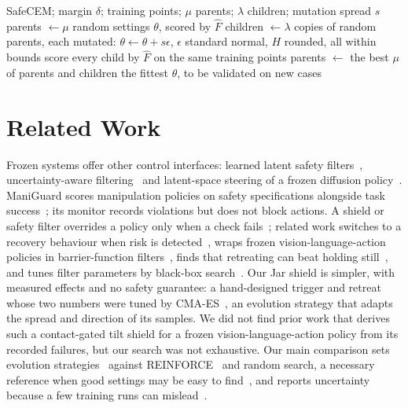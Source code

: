 \documentclass[sigconf,nonacm]{acmart}
\begin{document}
\begin{algorithm}[t]
\caption{Planned evolution search over a fixed adapter (not yet run)}
\label{alg:evo}
\small
\begin{algorithmic}[1]
\Require SafeCEM; margin $\delta$; training points; $\mu$ parents;
$\lambda$ children; mutation spread $s$
\State parents $\gets\mu$ random settings $\theta$, scored by $\hat F$
  \State children $\gets\lambda$ copies of random parents, each mutated:
  $\theta\gets\theta+s\epsilon$, $\epsilon$ standard normal, $H$ rounded,
  all within bounds
  \State score every child by $\hat F$ on the same training points
  \State parents $\gets$ the best $\mu$ of parents and children
\EndFor
\State \Return the fittest $\theta$, to be validated on new cases
\end{algorithmic}
\end{algorithm}

\section{Related Work}
Frozen systems offer other control interfaces: learned latent safety
filters~\cite{nakamura2025latent}, uncertainty-aware
filtering~\cite{seo2025unisafe} and latent-space steering of a frozen
diffusion policy~\cite{wagenmaker2025dsrl}. ManiGuard scores manipulation
policies on safety specifications alongside task
success~\cite{peng2026maniguard}; its monitor records violations but does
not block actions. A shield or safety filter overrides a policy only when a
check fails~\cite{alshiekh2018shielding,hsu2024safetyfilter}; related work
switches to a recovery behaviour when risk is
detected~\cite{thananjeyan2021recovery}, wraps frozen vision-language-action
policies in barrier-function filters~\cite{hu2025vlsa}, finds that
retreating can beat holding still~\cite{cao2026battery}, and tunes filter
parameters by black-box search~\cite{wang2025safebo}. Our Jar shield is
simpler, with measured effects and no safety guarantee: a hand-designed
trigger and retreat whose two numbers were tuned by
CMA-ES~\cite{hansen2001cma}, an evolution strategy that adapts the spread
and direction of its samples. We did not find prior work that derives such a
contact-gated tilt shield for a frozen vision-language-action policy from
its recorded failures, but our search was not exhaustive. Our main
comparison sets evolution strategies~\cite{salimans2017es} against
REINFORCE~\cite{williams1992reinforce} and random search, a necessary
reference when good settings may be easy to find~\cite{bergstra2012random},
and reports uncertainty because a few training runs can
mislead~\cite{agarwal2021statistics}.
\end{document}
